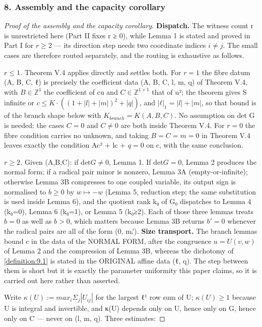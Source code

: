 \subsubsection*{8. Assembly and the capacity corollary}
\begin{proof}[Proof of the assembly and the capacity corollary]
\textbf{Dispatch.} The witness count r is unrestricted here (Part II fixes r ≥ 0), while Lemma 1 is stated and proved in Part I for $r ≥ 2$ — its direction step needs two coordinate indices $i ≠ j$. The small cases are therefore routed separately, and the routing is exhaustive as follows.

\emph{$r ≤ 1$.} Theorem V.4 applies directly and settles both. For $r = 1$ the fibre datum (A, B, C, ℓ) is precisely the coefficient data (A, B, C, l, m, q) of Theorem V.4, with $B ∈ ℤ^{1}$ the coefficient of cu and $C ∈ ℤ^{1×1}$ that of u²; the theorem gives S infinite or $c ≤ K·((1+|l|+|m|)^{2} + |q|)$, and $|ℓ|_{1} = |l|+|m|$, so that bound is of the branch shape below with $K_{branch} = K(A,B,C)$. No assumption on det G is needed: the cases $C = 0$ and $C ≠ 0$ are both inside Theorem V.4. For $r = 0$ the fibre condition carries no unknown, and taking $B = C = m = 0$ in Theorem V.4 leaves exactly the condition Ac² + lc + $q = 0$ on c, with the same conclusion.

\emph{$r ≥ 2$.} Given (A,B,C): if $\mathrm{det} G ≠ 0$, Lemma 1. If $\mathrm{det} G = 0$, Lemma 2 produces the normal form; if a radical pair minor is nonzero, Lemma 3A (empty-or-infinite); otherwise Lemma 3B compresses to one coupled variable, its output sign is normalised to $b ≥ 0$ by $w ↦ −w$ (Lemma 5, reduction step; the same substitution is used inside Lemma 6), and the quotient rank k₀ of G₀ dispatches to Lemma 4 (k₀=0), Lemma 6 (k₀=1), or Lemma 5 (k₀≥2). Each of those three lemmas treats $b = 0$ as well as $b > 0$, which matters because Lemma 3B returns $b′ = 0$ whenever the radical pairs are all of the form (0, mᵢ′). \textbf{Size transport.} The branch lemmas bound c in the data of the NORMAL FORM, after the congruence $u = U(v,w)$ of Lemma 2 and the compression of Lemma 3B, whereas the dichotomy of \cref{definition:9.1} is stated in the ORIGINAL affine data (ℓ, q). The step between them is short but it is exactly the parameter uniformity this paper claims, so it is carried out here rather than asserted.

Write $κ(U) := max_{i} Σ_{j} |U_{ij}|$ for the largest ℓ¹ row sum of U; $κ(U) ≥ 1$ because U is integral and invertible, and κ(U) depends only on U, hence only on G, hence only on C — never on (l, m, q). Three estimates:


\end{proof}
